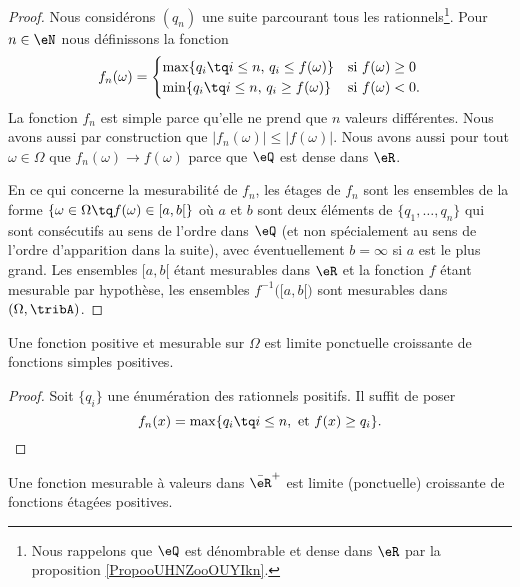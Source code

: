 \begin{proof}
    Nous considérons \( (q_n)\) une suite parcourant tous les rationnels\footnote{Nous rappelons que \( \eQ\) est dénombrable et dense dans \( \eR\) par la proposition \ref{PropooUHNZooOUYIkn}.}.
    Pour \( n\in \eN\) nous définissons la fonction
    \begin{equation}
        f_n(\omega)=\begin{cases}
            \max\{ q_i\tq i\leq n,\, q_i\leq f(\omega) \}    &   \text{si \( f(\omega)\geq 0\)}\\
            \min\{ q_i\tq i\leq n,\, q_i\geq f(\omega) \}    &    \text{si \( f(\omega)< 0\).}
        \end{cases}
    \end{equation}
    La fonction \( f_n\) est simple parce qu'elle ne prend que \( n\) valeurs différentes. Nous avons aussi par construction que \( | f_n(\omega)|\leq |f(\omega) |\). Nous avons aussi pour tout \( \omega\in \Omega\) que \( f_n(\omega)\to f(\omega)\) parce que \( \eQ\) est dense dans \( \eR\).

    En ce qui concerne la mesurabilité de \( f_n\), les étages de \( f_n\) sont les ensembles de la forme \( \{ \omega\in \Omega\tq f(\omega)\in\mathopen[ a , b [ \}\) où \( a\) et \( b\) sont deux éléments de \( \{ q_1,\ldots, q_n \}\) qui sont consécutifs au sens de l'ordre dans \( \eQ\) (et non spécialement au sens de l'ordre d'apparition dans la suite), avec éventuellement \( b=\infty\) si \( a\) est le plus grand. Les ensembles \( \mathopen[ a , b [\) étant mesurables dans \( \eR\) et la fonction \( f\) étant mesurable par hypothèse, les ensembles \( f^{-1}\Big( \mathopen[ a , b [ \Big)\) sont mesurables dans \( (\Omega,\tribA)\).
\end{proof}

\begin{proposition}\label{PropWBavIf}
    Une fonction positive et mesurable sur \( \Omega\) est limite ponctuelle croissante de fonctions simples positives.
\end{proposition}

\begin{proof}
    Soit \( \{ q_i \}\) une énumération des rationnels positifs. Il suffit de poser
    \begin{equation}
        f_n(x)=\max\{ q_i\tq i\leq n,\text{ et }f(x)\geq q_i \}.
    \end{equation}
\end{proof}

\begin{theorem}\label{THOooXHIVooKUddLi}       
    Une fonction mesurable à valeurs dans \( \bar \eR^+\) est limite (ponctuelle) croissante de fonctions étagées positives.
\end{theorem}

